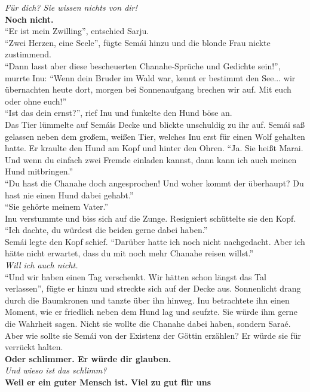 \textit{Für dich? Sie wissen nichts von dir!}\\
\textbf{Noch nicht.}\\
``Er ist mein Zwilling'', entschied Sarju.\\
``Zwei Herzen, eine Seele'', fügte Semái hinzu und die blonde Frau nickte zustimmend.\\
``Dann lasst aber diese bescheuerten Chanahe-Sprüche und Gedichte sein!'', murrte Inu: ``Wenn dein 
Bruder im Wald war, kennt er bestimmt den See... wir übernachten heute dort, morgen bei 
Sonnenaufgang brechen wir auf. Mit euch oder ohne euch!''\\


``Ist das dein ernst?'', rief Inu und funkelte den Hund böse an. \\
Das Tier lümmelte auf Semáis Decke und blickte unschuldig zu ihr auf. Semái saß gelassen neben dem 
großem, weißen Tier, welches Inu erst für einen Wolf gehalten hatte. Er kraulte den Hund am Kopf 
und hinter den Ohren. ``Ja. Sie heißt Marai. Und wenn du einfach zwei Fremde einladen kannst, dann 
kann ich auch meinen Hund mitbringen.''\\
``Du hast die Chanahe doch angesprochen! Und woher kommt der überhaupt? Du hast nie einen Hund 
dabei gehabt.''\\
``Sie gehörte meinem Vater.''\\
Inu verstummte und biss sich auf die Zunge. Resigniert schüttelte sie den Kopf. ``Ich dachte, du 
würdest die beiden gerne dabei haben.''\\
Semái legte den Kopf schief. ``Darüber hatte ich noch nicht nachgedacht. Aber ich hätte nicht 
erwartet, dass du mit noch mehr Chanahe reisen willst.''\\
\textit{Will ich auch nicht.}\\
``Und wir haben einen Tag verschenkt. Wir hätten schon längst das Tal verlassen'', fügte er hinzu 
und streckte sich auf der Decke aus. Sonnenlicht drang durch die Baumkronen und tanzte über ihn 
hinweg. Inu betrachtete ihn einen Moment, wie er friedlich neben dem Hund lag und seufzte. Sie 
würde ihm gerne die Wahrheit sagen. Nicht sie wollte die Chanahe dabei haben, sondern Saraé. Aber 
wie sollte sie Semái von der Existenz der Göttin erzählen? Er würde sie für verrückt halten. \\
\textbf{Oder schlimmer. Er würde dir glauben.}\\
\textit{Und wieso ist das schlimm?}\\
\textbf{Weil er ein guter Mensch ist. Viel zu gut für uns}\\
